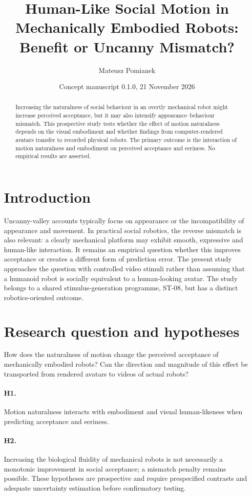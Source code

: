 \documentclass[11pt,a4paper]{article}
\title{Human-Like Social Motion in Mechanically Embodied Robots: Benefit or Uncanny Mismatch?}
\author{Mateusz Pomianek}
\date{Concept manuscript 0.1.0, 21 November 2026}
\begin{document}
\maketitle
\begin{abstract}
Increasing the naturalness of social behaviour in an overtly mechanical robot might increase perceived acceptance, but it may also intensify appearance--behaviour mismatch. This prospective study tests whether the effect of motion naturalness depends on the visual embodiment and whether findings from computer-rendered avatars transfer to recorded physical robots. The primary outcome is the interaction of motion naturalness and embodiment on perceived acceptance and eeriness. No empirical results are asserted.
\end{abstract}
\section{Introduction}
Uncanny-valley accounts typically focus on appearance or the incompatibility of appearance and movement. In practical social robotics, the reverse mismatch is also relevant: a clearly mechanical platform may exhibit smooth, expressive and human-like interaction. It remains an empirical question whether this improves acceptance or creates a different form of prediction error. The present study approaches the question with controlled video stimuli rather than assuming that a humanoid robot is socially equivalent to a human-looking avatar. The study belongs to a shared stimulus-generation programme, ST-08, but has a distinct robotics-oriented outcome.

\section{Research question and hypotheses}
How does the naturalness of motion change the perceived acceptance of mechanically embodied robots? Can the direction and magnitude of this effect be transported from rendered avatars to videos of actual robots?
\paragraph{H1.} Motion naturalness interacts with embodiment and visual human-likeness when predicting acceptance and eeriness.
\paragraph{H2.} Increasing the biological fluidity of mechanical robots is not necessarily a monotonic improvement in social acceptance; a mismatch penalty remains possible.
These hypotheses are prospective and require prespecified contrasts and adequate uncertainty estimation before confirmatory testing.
\end{document}
